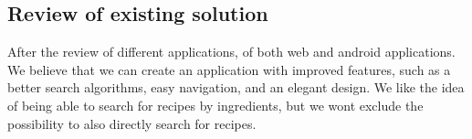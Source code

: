 \subsection*{Review of existing solution}
 After the review of different applications, of both web and android applications. We believe that we can create an application with improved features, such as a better search algorithms, easy navigation, and an elegant design. We like the idea of being able to search for recipes by ingredients, but we wont exclude the possibility to also directly search for recipes.

